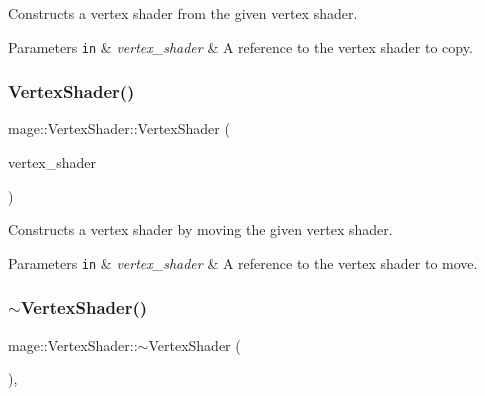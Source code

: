 Constructs a vertex shader from the given vertex shader.


\begin{DoxyParams}[1]{Parameters}
\mbox{\tt in}  & {\em vertex\+\_\+shader} & A reference to the vertex shader to copy. \\
\hline
\end{DoxyParams}
\hypertarget{classmage_1_1_vertex_shader_adb9497fa9e712c3b7c94d377408c24f3}{}\label{classmage_1_1_vertex_shader_adb9497fa9e712c3b7c94d377408c24f3} 
\subsubsection{\texorpdfstring{Vertex\+Shader()}{VertexShader()}\hspace{0.1cm}{\footnotesize\ttfamily [4/4]}}
{\footnotesize\ttfamily mage\+::\+Vertex\+Shader\+::\+Vertex\+Shader (\begin{DoxyParamCaption}\item[{\hyperlink{classmage_1_1_vertex_shader}{Vertex\+Shader} \&\&}]{vertex\+\_\+shader }\end{DoxyParamCaption})\hspace{0.3cm}{\ttfamily [default]}}

Constructs a vertex shader by moving the given vertex shader.


\begin{DoxyParams}[1]{Parameters}
\mbox{\tt in}  & {\em vertex\+\_\+shader} & A reference to the vertex shader to move. \\
\hline
\end{DoxyParams}
\hypertarget{classmage_1_1_vertex_shader_aa475ad31613dd20fdcc4930409fd0cfd}{}\label{classmage_1_1_vertex_shader_aa475ad31613dd20fdcc4930409fd0cfd} 
\subsubsection{\texorpdfstring{$\sim$\+Vertex\+Shader()}{~VertexShader()}}
{\footnotesize\ttfamily mage\+::\+Vertex\+Shader\+::$\sim$\+Vertex\+Shader (\begin{DoxyParamCaption}{ }\end{DoxyParamCaption})\hspace{0.3cm}{\ttfamily [virtual]}, {\ttfamily [default]}}


